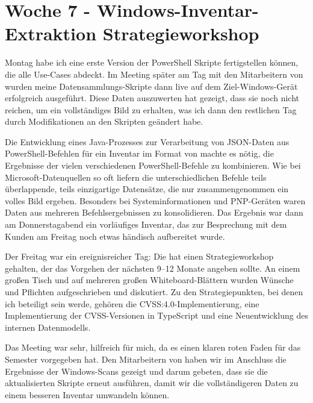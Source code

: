 \section{Woche 7 - Windows-Inventar-Extraktion \headerand Strategieworkshop} \label{sec:bericht-wo-7}


\lweekdaymarginpar{\weekdayMondayShort, \weekdayTuesdayShort}

Montag habe ich eine erste Version der PowerShell Skripte fertigstellen können, die alle Use-Cases abdeckt.
Im Meeting später am Tag mit den Mitarbeitern von {\aeclientZEZESE} wurden meine Datensammlungs-Skripte dann live auf dem Ziel-Windows-Gerät erfolgreich ausgeführt.
Diese Daten auszuwerten hat gezeigt, dass sie noch nicht reichen, um ein vollständiges Bild zu erhalten, was ich dann den restlichen Tag durch Modifikationen an den Skripten geändert habe.

\sweekdaymarginpar{\weekdayWednesdayShort, \weekdayThursdayShort}

Die Entwicklung eines Java-Prozesses zur Verarbeitung von JSON-Daten aus PowerShell-Befehlen für ein Inventar im Format von {\metaeffekt} machte es nötig, die Ergebnisse der vielen verschiedenen PowerShell-Befehle zu kombinieren.
Wie bei Microsoft-Datenquellen so oft liefern die unterschiedlichen Befehle teils überlappende, teils einzigartige Datensätze, die nur zusammengenommen ein volles Bild ergeben.
Besonders bei Systeminformationen und PNP-Geräten waren Daten aus mehreren Befehlsergebnissen zu konsolidieren.
Das Ergebnis war dann am Donnerstagabend ein vorläufiges Inventar, das zur Besprechung mit dem Kunden am Freitag noch etwas händisch aufbereitet wurde.

\sweekdaymarginpar{\weekdayFridayLong}

Der Freitag war ein ereignisreicher Tag:
Die {\metaeffekt} hat einen Strategieworkshop gehalten, der das Vorgehen der nächsten 9--12 Monate angeben sollte.
An einem großen Tisch und auf mehreren großen Whiteboard-Blättern wurden Wünsche und Pflichten aufgeschrieben und diskutiert.
Zu den Strategiepunkten, bei denen ich beteiligt sein werde, gehören die CVSS:4.0-Implementierung, eine Implementierung der CVSS-Versionen in TypeScript und eine Neuentwicklung des internen Datenmodells.

Das Meeting war sehr, hilfreich für mich, da es einen klaren roten Faden für das Semester vorgegeben hat.
Den Mitarbeitern von {\aeclientZEZESE} haben wir im Anschluss die Ergebnisse der Windows-Scans gezeigt und darum gebeten, dass sie die aktualisierten Skripte erneut ausführen, damit wir die vollständigeren Daten zu einem besseren Inventar umwandeln können.
